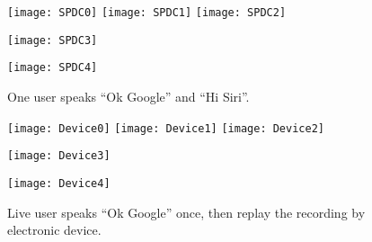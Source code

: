 \newpage
\begin{figure}[H]
	\centering
	\begin{minipage}[t]{.8\linewidth}
		\centering
		\texttt{[image: SPDC0]}
		\vspace{-.2in}
		\vspace{.2in}
		\texttt{[image: SPDC1]}
		\texttt{[image: SPDC2]}
		\vspace{-.2in}
		\vspace{.2in}
	\end{minipage}
	\begin{minipage}[t]{.45\linewidth}
		\centering
		\texttt{[image: SPDC3]}
		\vspace{-.2in}
	\end{minipage}
	\begin{minipage}[t]{.45\linewidth}
		\centering
		\texttt{[image: SPDC4]}
		\vspace{-.2in}
	\end{minipage}
	\caption{One user speaks ``Ok Google'' and ``Hi Siri''.}
	\label{fig:SPDC}
\end{figure}
\newpage
\begin{figure}[H]
	\centering
	\begin{minipage}[t]{.8\linewidth}
		\centering
		\texttt{[image: Device0]}
		\vspace{-.2in}
		\vspace{.2in}
		\texttt{[image: Device1]}
		\texttt{[image: Device2]}
		\vspace{-.2in}
		\vspace{.2in}
	\end{minipage}
	\begin{minipage}[t]{.45\linewidth}
		\centering
		\texttt{[image: Device3]}
		\vspace{-.2in}
	\end{minipage}
	\begin{minipage}[t]{.45\linewidth}
		\centering
		\texttt{[image: Device4]}
		\vspace{-.2in}
		\label{fig:deviced}
	\end{minipage}
	\caption{Live user speaks ``Ok Google'' once, then replay the recording by electronic device.}
	\label{fig:device}
\end{figure}
\newpage


